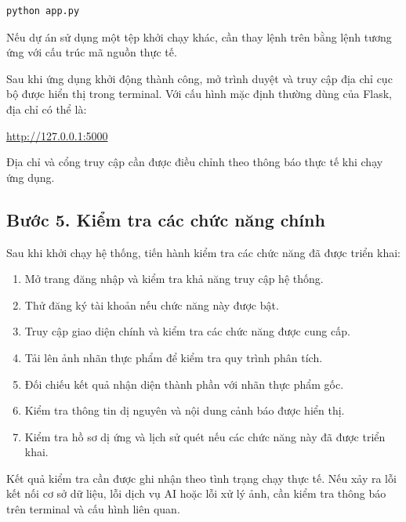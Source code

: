 \begin{lstlisting}[language=bash, caption={Khởi chạy ứng dụng Flask}]
python app.py
\end{lstlisting}

Nếu dự án sử dụng một tệp khởi chạy khác, cần thay lệnh trên bằng
lệnh tương ứng với cấu trúc mã nguồn thực tế.

Sau khi ứng dụng khởi động thành công, mở trình duyệt và truy cập
địa chỉ cục bộ được hiển thị trong terminal. Với cấu hình mặc định
thường dùng của Flask, địa chỉ có thể là:

\begin{center}
    \url{http://127.0.0.1:5000}
\end{center}

Địa chỉ và cổng truy cập cần được điều chỉnh theo thông báo thực tế
khi chạy ứng dụng.

\subsection*{Bước 5. Kiểm tra các chức năng chính}

Sau khi khởi chạy hệ thống, tiến hành kiểm tra các chức năng đã
được triển khai:
\begin{enumerate}
    \item Mở trang đăng nhập và kiểm tra khả năng truy cập hệ thống.
    \item Thử đăng ký tài khoản nếu chức năng này được bật.
    \item Truy cập giao diện chính và kiểm tra các chức năng được cung cấp.
    \item Tải lên ảnh nhãn thực phẩm để kiểm tra quy trình phân tích.
    \item Đối chiếu kết quả nhận diện thành phần với nhãn thực phẩm gốc.
    \item Kiểm tra thông tin dị nguyên và nội dung cảnh báo được hiển thị.
    \item Kiểm tra hồ sơ dị ứng và lịch sử quét nếu các chức năng này
    đã được triển khai.
\end{enumerate}

Kết quả kiểm tra cần được ghi nhận theo tình trạng chạy thực tế.
Nếu xảy ra lỗi kết nối cơ sở dữ liệu, lỗi dịch vụ AI hoặc lỗi xử
lý ảnh, cần kiểm tra thông báo trên terminal và cấu hình liên quan.



